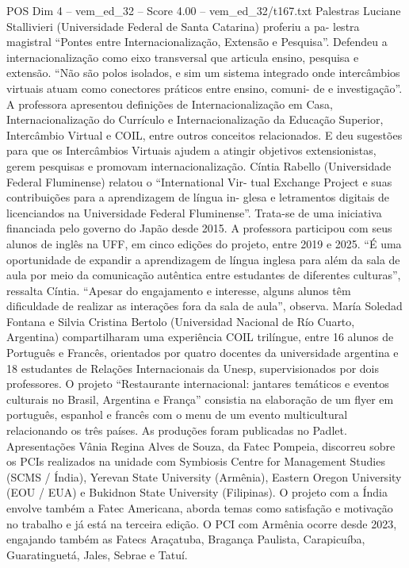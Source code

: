 \begin{textsample}{POS Dim 4 – vem\_ed\_32 – Score 4.00 – vem\_ed\_32/t167.txt}
Palestras Luciane Stallivieri (Universidade Federal de Santa Catarina) proferiu a pa- lestra magistral “Pontes entre Internacionalização, Extensão e Pesquisa”.
Defendeu a internacionalização como eixo transversal que articula ensino, pesquisa e extensão. “Não são polos isolados, e sim um sistema integrado onde intercâmbios virtuais atuam como conectores práticos entre ensino, comuni- de e investigação”.
A professora apresentou definições de Internacionalização em Casa, Internacionalização do Currículo e Internacionalização da Educação Superior, Intercâmbio Virtual e COIL, entre outros conceitos relacionados.
E deu sugestões para que os Intercâmbios Virtuais ajudem a atingir objetivos extensionistas, gerem pesquisas e promovam internacionalização.
Cíntia Rabello (Universidade Federal Fluminense) relatou o “International Vir- tual Exchange Project e suas contribuições para a aprendizagem de língua in- glesa e letramentos digitais de licenciandos na Universidade Federal Fluminense”.
Trata-se de uma iniciativa financiada pelo governo do Japão desde 2015.
A professora participou com seus alunos de inglês na UFF, em cinco edições do projeto, entre 2019 e 2025. “É uma oportunidade de expandir a aprendizagem de língua inglesa para além da sala de aula por meio da comunicação autêntica entre estudantes de diferentes culturas”, ressalta Cíntia. “Apesar do engajamento e interesse, alguns alunos têm dificuldade de realizar as interações fora da sala de aula”, observa.
María Soledad Fontana e Silvia Cristina Bertolo (Universidad Nacional de Río Cuarto, Argentina) compartilharam uma experiência COIL trilíngue, entre 16 alunos de Português e Francês, orientados por quatro docentes da universidade argentina e 18 estudantes de Relações Internacionais da Unesp, supervisionados por dois professores.
O projeto “Restaurante internacional: jantares temáticos e eventos culturais no Brasil, Argentina e França” consistia na elaboração de um flyer em português, espanhol e francês com o menu de um evento multicultural relacionando os três países.
As produções foram publicadas no Padlet.
Apresentações Vânia Regina Alves de Souza, da Fatec Pompeia, discorreu sobre os PCIs realizados na unidade com Symbiosis Centre for Management Studies (SCMS / Índia), Yerevan State University (Armênia), Eastern Oregon University (EOU / EUA) e Bukidnon State University (Filipinas).
O projeto com a Índia envolve também a Fatec Americana, aborda temas como satisfação e motivação no trabalho e já está na terceira edição.
O PCI com Armênia ocorre desde 2023, engajando também as Fatecs Araçatuba, Bragança Paulista, Carapicuíba, Guaratinguetá, Jales, Sebrae e Tatuí.

\end{textsample}
